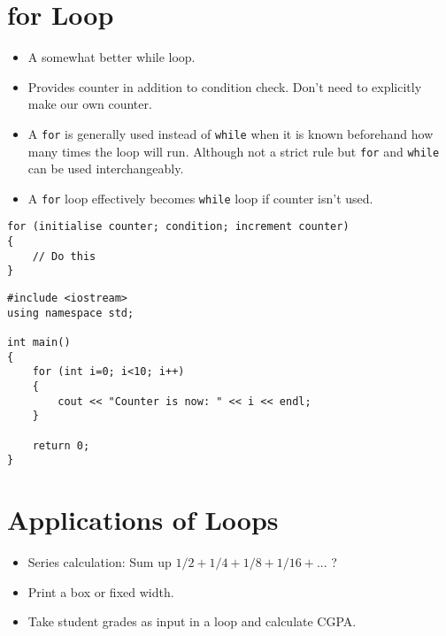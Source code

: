 \documentclass[12pt,a4paper]{article}
\begin{document}
\section{for Loop}
\begin{itemize}
\item A somewhat better while loop.
\item Provides counter in addition to condition check. Don't need to explicitly make our own counter.
\item A \verb|for| is generally used instead of \verb|while| when it is known beforehand how many times the loop will run. Although not a strict rule but \verb|for| and \verb|while| can be used interchangeably.
\item A \verb|for| loop effectively becomes \verb|while| loop if counter isn't used.
\end{itemize}
\begin{lstlisting}[caption={for Loop}]
for (initialise counter; condition; increment counter)
{
	// Do this
}
\end{lstlisting}
\begin{lstlisting}[caption={for Loop With Counter}]
#include <iostream>
using namespace std;

int main()
{
	for (int i=0; i<10; i++)
	{
		cout << "Counter is now: " << i << endl;
	}
	
	return 0;
}
\end{lstlisting}
\section{Applications of Loops}
\begin{itemize}
\item Series calculation: Sum up $1/2 + 1/4 + 1/8 + 1/16 + ...$ ?
\item Print a box or fixed width.
\item Take student grades as input in a loop and calculate CGPA.
\end{itemize}
\end{document}
